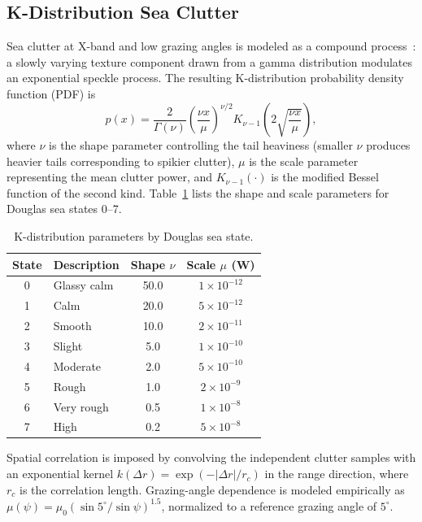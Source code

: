 \documentclass[conf]{new-aiaa}
\begin{document}
\subsection{K-Distribution Sea Clutter}
Sea clutter at X-band and low grazing angles is modeled as a compound process~\cite{Ward1981, Ward2013}: a slowly varying texture component drawn from a gamma distribution modulates an exponential speckle process. The resulting K-distribution probability density function (PDF) is
\begin{equation}\label{eq:kdist}
p(x) = \frac{2}{\Gamma(\nu)} \left(\frac{\nu x}{\mu}\right)^{\!\nu/2} K_{\nu-1}\!\left(2\sqrt{\frac{\nu x}{\mu}}\right),
\end{equation}
where $\nu$ is the shape parameter controlling the tail heaviness (smaller $\nu$ produces heavier tails corresponding to spikier clutter), $\mu$ is the scale parameter representing the mean clutter power, and $K_{\nu-1}(\cdot)$ is the modified Bessel function of the second kind. Table~\ref{tab:sea_state} lists the shape and scale parameters for Douglas sea states 0--7.

\begin{table}[htb]
\centering
\caption{K-distribution parameters by Douglas sea state.}
\label{tab:sea_state}
\begin{tabular}{@{}clcc@{}}
\toprule
\textbf{State} & \textbf{Description} & \textbf{Shape $\nu$} & \textbf{Scale $\mu$ (W)} \\
\midrule
0 & Glassy calm   & 50.0 & $1\times10^{-12}$ \\
1 & Calm          & 20.0 & $5\times10^{-12}$ \\
2 & Smooth        & 10.0 & $2\times10^{-11}$ \\
3 & Slight        &  5.0 & $1\times10^{-10}$ \\
4 & Moderate      &  2.0 & $5\times10^{-10}$ \\
5 & Rough         &  1.0 & $2\times10^{-9}$ \\
6 & Very rough    &  0.5 & $1\times10^{-8}$ \\
7 & High          &  0.2 & $5\times10^{-8}$ \\
\bottomrule
\end{tabular}
\end{table}

Spatial correlation is imposed by convolving the independent clutter samples with an exponential kernel $k(\Delta r) = \exp(-|\Delta r|/r_c)$ in the range direction, where $r_c$ is the correlation length. Grazing-angle dependence is modeled empirically as $\mu(\psi) = \mu_0 (\sin 5^\circ / \sin\psi)^{1.5}$, normalized to a reference grazing angle of $5^\circ$.
\end{document}
